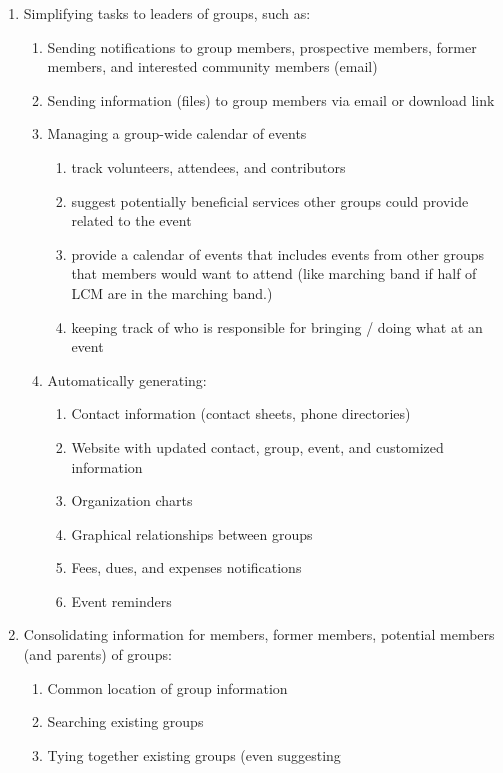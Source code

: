 		\begin{enumerate}
		\item Simplifying tasks to leaders of groups, such as:
			\begin{enumerate}
				\item Sending notifications to group members, prospective
					members, former members, and interested community
					members (email)
				\item Sending information (files) to group members via
					email or download link
				\item Managing a group-wide calendar of events
				\begin{enumerate}
					\item track volunteers, attendees, and contributors
					\item suggest potentially beneficial services other
						groups could provide related to the event
					\item provide a calendar of events that includes events
						from other groups that members would want to attend
						(like marching band if half of LCM are in the
						marching	band.)
					\item keeping track of who is responsible for bringing
						/ doing what at an event
				\end{enumerate}
				\item Automatically generating:
				\begin{enumerate}
					\item Contact information (contact sheets, phone
						directories)
					\item Website with updated contact, group, event, and
						customized information
					\item Organization charts
					\item Graphical relationships between groups
					\item Fees, dues, and expenses notifications
					\item Event reminders
				\end{enumerate}
			\end{enumerate}
			\item Consolidating information for members, former members,
				potential members (and parents) of groups:
			\begin{enumerate}
				\item Common location of group information
				\item Searching existing groups
				\item Tying together existing groups (even suggesting

\end{enumerate}
\end{enumerate}
